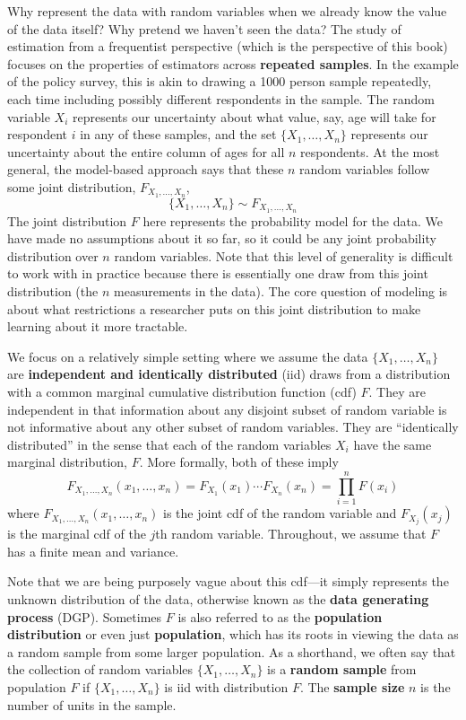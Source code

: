 \documentclass[
  13pt,
  letterpaper,
  DIV=11,
  numbers=noendperiod]{scrreprt}
\theoremstyle{plain}
\theoremstyle{plain}
\theoremstyle{definition}
\theoremstyle{definition}
\theoremstyle{remark}
\begin{document}
Why represent the data with random variables when we already know the
value of the data itself? Why pretend we haven't seen the data? The
study of estimation from a frequentist perspective (which is the
perspective of this book) focuses on the properties of estimators across
\textbf{repeated samples}. In the example of the policy survey, this is
akin to drawing a 1000 person sample repeatedly, each time including
possibly different respondents in the sample. The random variable
\(X_i\) represents our uncertainty about what value, say, age will take
for respondent \(i\) in any of these samples, and the set
\(\{X_{1}, \ldots, X_{n}\}\) represents our uncertainty about the entire
column of ages for all \(n\) respondents. At the most general, the
model-based approach says that these \(n\) random variables follow some
joint distribution, \(F_{X_{1},\ldots,X_{n}}\), \[
\{X_{1}, \ldots, X_{n}\} \sim F_{X_{1},\ldots,X_{n}}
\] The joint distribution \(F\) here represents the probability model
for the data. We have made no assumptions about it so far, so it could
be any joint probability distribution over \(n\) random variables. Note
that this level of generality is difficult to work with in practice
because there is essentially one draw from this joint distribution (the
\(n\) measurements in the data). The core question of modeling is about
what restrictions a researcher puts on this joint distribution to make
learning about it more tractable.

We focus on a relatively simple setting where we assume the data
\(\{X_1, \ldots, X_n\}\) are \textbf{independent and identically
distributed} (iid) draws from a distribution with a common marginal
cumulative distribution function (cdf) \(F\). They are independent in
that information about any disjoint subset of random variable is not
informative about any other subset of random variables. They are
``identically distributed'' in the sense that each of the random
variables \(X_i\) have the same marginal distribution, \(F\). More
formally, both of these imply \[
F_{X_{1},\ldots,X_{n}}(x_{1}, \ldots, x_{n}) = F_{X_{1}}(x_{1})\cdots F_{X_{n}}(x_{n}) = \prod_{i=1}^n F(x_i)
\] where \(F_{X_{1},\ldots,X_{n}}(x_{1}, \ldots, x_{n})\) is the joint
cdf of the random variable and \(F_{X_{j}}(x_{j})\) is the marginal cdf
of the \(j\)th random variable. Throughout, we assume that \(F\) has a
finite mean and variance.

Note that we are being purposely vague about this cdf---it simply
represents the unknown distribution of the data, otherwise known as the
\textbf{data generating process} (DGP). Sometimes \(F\) is also referred
to as the \textbf{population distribution} or even just
\textbf{population}, which has its roots in viewing the data as a random
sample from some larger population. As a shorthand, we often say that
the collection of random variables \(\{X_1, \ldots, X_n\}\) is a
\textbf{random sample} from population \(F\) if \(\{X_1, \ldots, X_n\}\)
is iid with distribution \(F\). The \textbf{sample size} \(n\) is the
number of units in the sample.
\end{document}
